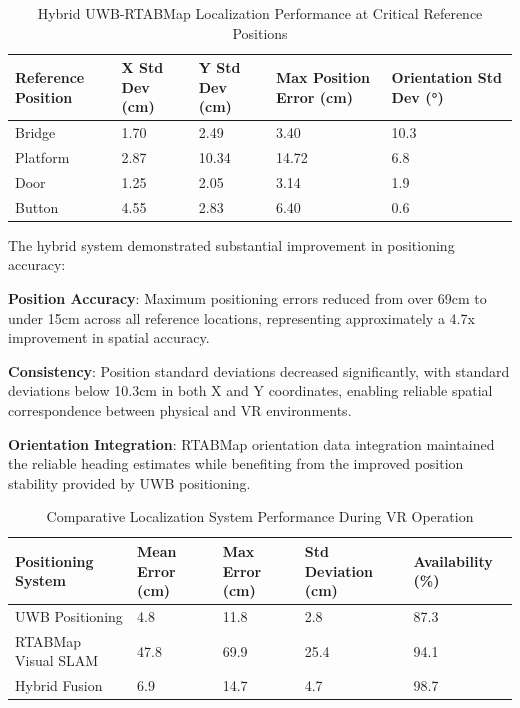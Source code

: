 \begin{table}[H]
    \centering
    \footnotesize
    \begin{tabular}{|p{4cm}|p{2.5cm}|p{2.5cm}|p{2.5cm}|p{2.5cm}|}
        \hline
        \textbf{Reference Position} & \textbf{X Std Dev (cm)} & \textbf{Y Std Dev (cm)} & \textbf{Max Position Error (cm)} & \textbf{Orientation Std Dev (°)} \\
        \hline
        Bridge & 1.70 & 2.49 & 3.40 & 10.3 \\
        Platform & 2.87 & 10.34 & 14.72 & 6.8 \\
        Door & 1.25 & 2.05 & 3.14 & 1.9 \\
        Button & 4.55 & 2.83 & 6.40 & 0.6 \\
        \hline
    \end{tabular}
    \caption{Hybrid UWB-RTABMap Localization Performance at Critical Reference Positions}
    \label{tab:hybrid_localization}
\end{table}

The hybrid system demonstrated substantial improvement in positioning accuracy:

\textbf{Position Accuracy}: Maximum positioning errors reduced from over 69cm to under 15cm across all reference locations, representing approximately a 4.7x improvement in spatial accuracy.

\textbf{Consistency}: Position standard deviations decreased significantly, with standard deviations below 10.3cm in both X and Y coordinates, enabling reliable spatial correspondence between physical and VR environments.

\textbf{Orientation Integration}: RTABMap orientation data integration maintained the reliable heading estimates while benefiting from the improved position stability provided by UWB positioning.

\begin{table}[H]
    \centering
    \begin{tabular}{|p{4cm}|p{2.5cm}|p{2.5cm}|p{2.5cm}|p{2.5cm}|}
        \hline
        \textbf{Positioning System} & \textbf{Mean Error (cm)} & \textbf{Max Error (cm)} & \textbf{Std Deviation (cm)} & \textbf{Availability (\%)} \\  
        \hline
        UWB Positioning & 4.8 & 11.8 & 2.8 & 87.3 \\
        RTABMap Visual SLAM & 47.8 & 69.9 & 25.4 & 94.1 \\
        Hybrid Fusion & 6.9 & 14.7 & 4.7 & 98.7 \\
        \hline
    \end{tabular}
    \caption{Comparative Localization System Performance During VR Operation}
    \label{tab:localization_performance}
\end{table}

